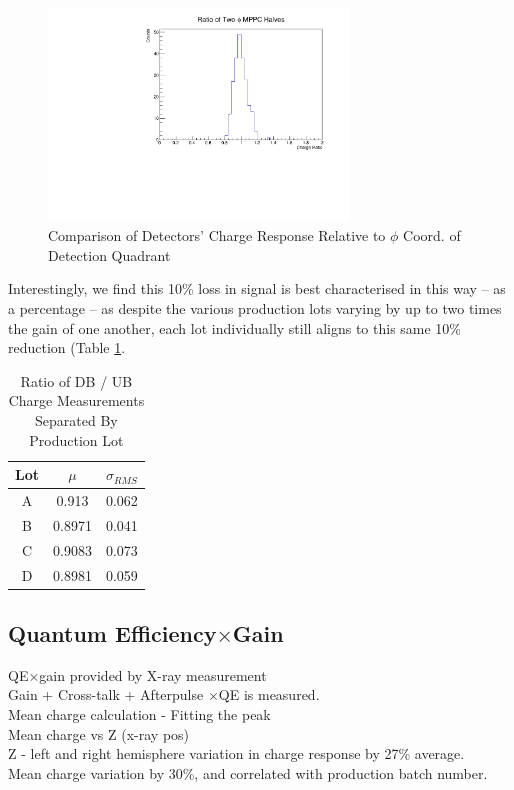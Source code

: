 \begin{figure}[H]
    \centering
    \includegraphics[width=8cm]{graphics/phihalfmppcqrationostats.pdf}
    \caption{Comparison of Detectors' Charge Response Relative to $\phi$ Coord. of Detection Quadrant}
    \label{fig:chargeratiobtwphihalves}
\end{figure}

Interestingly, we find this 10\% loss in signal is best characterised in this way -- as a percentage -- as despite the various production lots varying by up to two times the gain of one another, each lot individually still aligns to this same 10\% reduction (Table \ref{tab:lotquadqrat}.
\begin{table}[H]
    \centering
    \begin{tabular}{c||c|c}
        Lot & $\mu$ & $\sigma_{RMS}$ \\
        \hline
        A & 0.913 & 0.062 \\
        B & 0.8971 & 0.041 \\
        C & 0.9083 & 0.073 \\
        D & 0.8981 & 0.059
    \end{tabular}
    \caption{Ratio of DB / UB Charge Measurements Separated By Production Lot}
    \label{tab:lotquadqrat}
\end{table}


\subsection{Quantum Efficiency$\times$Gain} \label{QEsec}

\noindent QE$\times$gain provided by X-ray measurement \\
Gain + Cross-talk + Afterpulse $\times$QE is measured. \\
Mean charge calculation - Fitting the peak \\
Mean charge vs Z (x-ray pos) \\
Z - left and right hemisphere variation in charge response by 27\% average. \\
Mean charge variation by 30\%, and correlated with production batch number. \\


